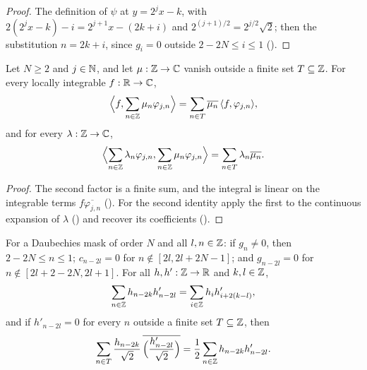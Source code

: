 \begin{proof}
\leanok
{}
The definition of $\psi$ at $y = 2^j x - k$, with $2(2^j x - k) - i = 2^{j+1} x - (2k + i)$ and
$2^{(j+1)/2} = 2^{j/2} \sqrt 2$; then the substitution $n = 2k + i$, since $g_i = 0$ outside
$2 - 2N \leq i \leq 1$ ().
\end{proof}

\begin{lemma}
\label{lem:daub-finite-expansions}
\leanok
{}
Let $N \geq 2$ and $j \in \mathbb{N}$, and let $\mu : \mathbb{Z} \to \mathbb{C}$ vanish outside a finite set
$T \subseteq \mathbb{Z}$. For every locally integrable $f : \mathbb{R} \to \mathbb{C}$,
\[
  \Bigl\langle f, \sum_{n \in \mathbb{Z}} \mu_n \varphi_{j,n} \Bigr\rangle
  = \sum_{n \in T} \overline{\mu_n} \, \langle f, \varphi_{j,n} \rangle ,
\]
and for every $\lambda : \mathbb{Z} \to \mathbb{C}$,
\[
  \Bigl\langle \sum_{n \in \mathbb{Z}} \lambda_n \varphi_{j,n}, \sum_{n \in \mathbb{Z}} \mu_n \varphi_{j,n}
  \Bigr\rangle = \sum_{n \in T} \lambda_n \overline{\mu_n} .
\]
\end{lemma}

\begin{proof}
\leanok
{}
The second factor is a finite sum, and the integral is linear on the integrable terms
$f \overline{\varphi_{j,n}}$ (). For the second identity apply the
first to the continuous expansion of $\lambda$ () and recover its
coefficients ().
\end{proof}

\begin{lemma}
\label{lem:daub-shifted-filters}
\leanok
{}
For a Daubechies mask of order $N$ and all $l, n \in \mathbb{Z}$: if $g_n \neq 0$, then
$2 - 2N \leq n \leq 1$; $c_{n-2l} = 0$ for $n \notin [2l, 2l + 2N - 1]$; and $g_{n-2l} = 0$ for
$n \notin [2l + 2 - 2N, 2l + 1]$. For all $h, h' : \mathbb{Z} \to \mathbb{R}$ and $k, l \in \mathbb{Z}$,
\[
  \sum_{n \in \mathbb{Z}} h_{n-2k} h'_{n-2l} = \sum_{i \in \mathbb{Z}} h_i h'_{i + 2(k-l)} ,
\]
and if $h'_{n-2l} = 0$ for every $n$ outside a finite set $T \subseteq \mathbb{Z}$, then
\[
  \sum_{n \in T} \frac{h_{n-2k}}{\sqrt 2} \, \overline{\Bigl(\frac{h'_{n-2l}}{\sqrt 2}\Bigr)}
  = \frac12 \sum_{n \in \mathbb{Z}} h_{n-2k} h'_{n-2l} .
\]
\end{lemma}


